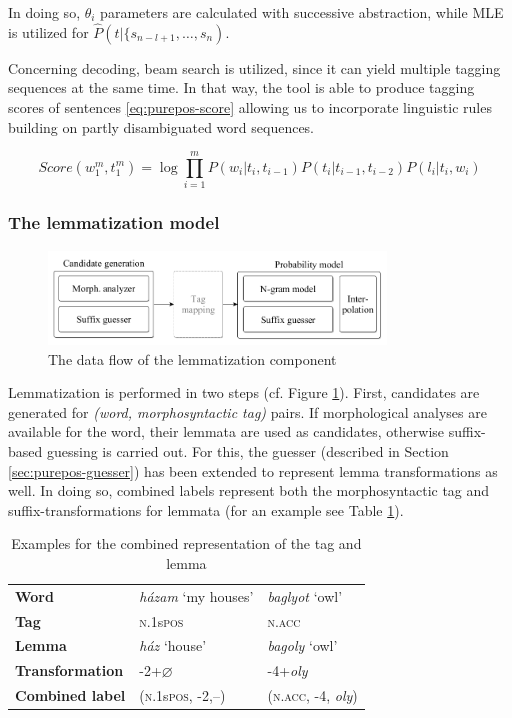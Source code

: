 In doing so, $\theta_i$ parameters are calculated with successive abstraction, while MLE is utilized  for $\hat{P}(t|\{s_{n-l+1}, \dots, s_n)$. 

Concerning decoding, beam search is utilized, since it can yield multiple tagging sequences at the same time. 
In that way, the tool is able to produce tagging scores of sentences \eqref{eq:purepos-score} allowing us to incorporate linguistic rules building on partly disambiguated word sequences. 

\begin{equation}\label{eq:purepos-score} %
Score(w_1^m,t_1^m) = \log \prod_{i=1}^m P(w_i|t_i,t_{i-1})P(t_i|t_{i-1},t_{i-2})P(l_i|t_i,w_i)
\end{equation}

\subsubsection{The lemmatization model}

\begin{figure}[ht]
  \centering
  \includegraphics[width=0.8\textwidth]{MorphTagging/lemma_arch.png} %
  \caption{The data flow of the lemmatization component}
  \label{fig:lemma-arch}
\end{figure}

Lemmatization is performed in two steps (cf. Figure \ref{fig:lemma-arch}). 
First, candidates are generated for \emph{(word, morphosyntactic tag)} pairs. 
If morphological analyses are available for the word, their lemmata are used as candidates, otherwise suffix-based guessing is carried out. 
For this, the guesser (described in Section \ref{sec:purepos-guesser}) has been extended to represent lemma transformations as well. 
In doing so, combined labels represent both the morphosyntactic tag and suffix-transformations for lemmata (for an example see Table \ref{tab:lemma-example}).


\begin{table}[ht]
\centering
\caption{Examples for the combined representation of the tag and lemma}
\label{tab:lemma-example}
\begin{tabular}{l | l l}
   \textbf{Word} &  \emph{házam} `my houses’ &  \emph{baglyot} `owl’ \\
   \textbf{Tag} &  \textsc{n.1}s\textsc{pos} &  \textsc{n.acc} \\
   \textbf{Lemma} &  \emph{ház} `house’ &  \emph{bagoly} `owl’ \\
   \textbf{Transformation} & -2+$\varnothing$ &  -4+\emph{oly} \\
   \textbf{Combined label} & (\textsc{n.1}s\textsc{pos}, -2,--) &  (\textsc{n.acc}, -4, \emph{oly}) \\
\end{tabular}
\end{table}


